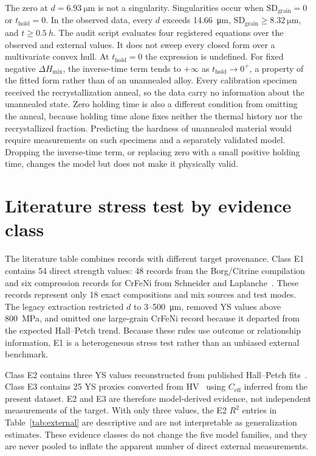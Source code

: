 \documentclass[a4paper,11pt]{article}
\begin{document}
The zero at $d=\SI{6.93}{\micro\meter}$ is not a singularity. Singularities occur when $\mathrm{SD}_{\mathrm{grain}}=0$ or $t_{\mathrm{hold}}=0$. In the observed data, every $d$ exceeds \SI{14.66}{\micro\meter}, $\mathrm{SD}_{\mathrm{grain}}\geq\SI{8.32}{\micro\meter}$, and $t\geq\SI{0.5}{h}$. The audit script evaluates four registered equations over the observed and external values. It does not sweep every closed form over a multivariate convex hull. At $t_{\mathrm{hold}}=0$ the expression is undefined. For fixed negative $\Delta H_{\mathrm{mix}}$, the inverse-time term tends to $+\infty$ as $t_{\mathrm{hold}}\to0^+$, a property of the fitted form rather than of an unannealed alloy. Every calibration specimen received the recrystallization anneal, so the data carry no information about the unannealed state. Zero holding time is also a different condition from omitting the anneal, because holding time alone fixes neither the thermal history nor the recrystallized fraction. Predicting the hardness of unannealed material would require measurements on such specimens and a separately validated model. Dropping the inverse-time term, or replacing zero with a small positive holding time, changes the model but does not make it physically valid.

\section{Literature stress test by evidence class}
\label{si:external}

The literature table combines records with different target provenance. Class E1 contains 54 direct strength values: 48 records from the Borg/Citrine compilation~\cite{Borg2020} and six compression records for CrFeNi from Schneider and Laplanche~\cite{SchneiderCrFeNi2021}. These records represent only 18 exact compositions and mix sources and test modes. The legacy extraction restricted $d$ to 3--\SI{500}{\micro\meter}, removed YS values above \SI{800}{MPa}, and omitted one large-grain CrFeNi record because it departed from the expected Hall--Petch trend. Because these rules use outcome or relationship information, E1 is a heterogeneous stress test rather than an unbiased external benchmark.

Class E2 contains three YS values reconstructed from published Hall--Petch fits~\cite{Otto2013}. Class E3 contains 25 YS proxies converted from HV~\cite{HuangTY2019} using $C_{\mathrm{eff}}$ inferred from the present dataset. E2 and E3 are therefore model-derived evidence, not independent measurements of the target. With only three values, the E2 $R^2$ entries in Table~\ref{tab:external} are descriptive and are not interpretable as generalization estimates. These evidence classes do not change the five model families, and they are never pooled to inflate the apparent number of direct external measurements.
\end{document}
